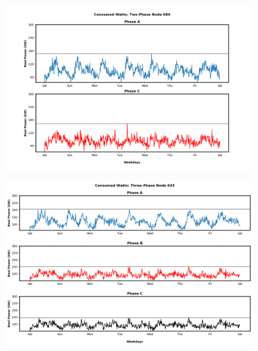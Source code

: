 \begin{figure}[H]
    \centering
    \includegraphics[width=1.1\columnwidth]{Pictures/basecase_two_phase_684_power.png}
    \caption{ }
\end{figure}

\newpage

\begin{figure}[H]
    \centering
    \includegraphics[width=1.1\columnwidth]{Pictures/basecase_three_phase_633_power.png}
    \caption{ }
\end{figure}
\newpage


